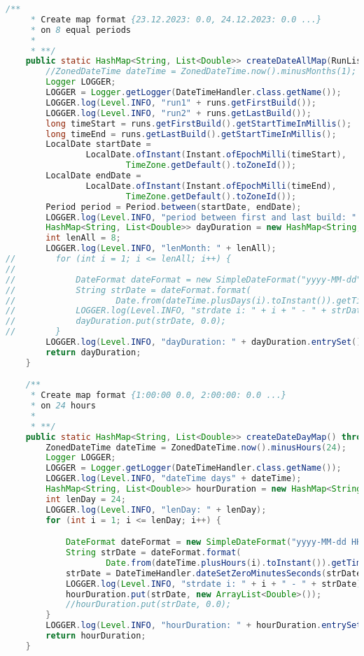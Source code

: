 \begin{lstlisting}[language=Java]
    /**
     * Create map format {23.12.2023: 0.0, 24.12.2023: 0.0 ...}
     * on 8 equal periods
     *
     * **/
    public static HashMap<String, List<Double>> createDateAllMap(RunList<Run> runs) {
        //ZonedDateTime dateTime = ZonedDateTime.now().minusMonths(1);
        Logger LOGGER;
        LOGGER = Logger.getLogger(DateTimeHandler.class.getName());
        LOGGER.log(Level.INFO, "run1" + runs.getFirstBuild());
        LOGGER.log(Level.INFO, "run2" + runs.getLastBuild());
        long timeStart = runs.getFirstBuild().getStartTimeInMillis();
        long timeEnd = runs.getLastBuild().getStartTimeInMillis();
        LocalDate startDate =
                LocalDate.ofInstant(Instant.ofEpochMilli(timeStart),
                        TimeZone.getDefault().toZoneId());
        LocalDate endDate =
                LocalDate.ofInstant(Instant.ofEpochMilli(timeEnd),
                        TimeZone.getDefault().toZoneId());
        Period period = Period.between(startDate, endDate);
        LOGGER.log(Level.INFO, "period between first and last build: " + period);
        HashMap<String, List<Double>> dayDuration = new HashMap<String, List<Double>>();
        int lenAll = 8;
        LOGGER.log(Level.INFO, "lenMonth: " + lenAll);
//        for (int i = 1; i <= lenAll; i++) {
//
//            DateFormat dateFormat = new SimpleDateFormat("yyyy-MM-dd");
//            String strDate = dateFormat.format(
//                    Date.from(dateTime.plusDays(i).toInstant()).getTime());
//            LOGGER.log(Level.INFO, "strdate i: " + i + " - " + strDate);
//            dayDuration.put(strDate, 0.0);
//        }
        LOGGER.log(Level.INFO, "dayDuration: " + dayDuration.entrySet());
        return dayDuration;
    }

    /**
     * Create map format {1:00:00 0.0, 2:00:00: 0.0 ...}
     * on 24 hours
     *
     * **/
    public static HashMap<String, List<Double>> createDateDayMap() throws ParseException {
        ZonedDateTime dateTime = ZonedDateTime.now().minusHours(24);
        Logger LOGGER;
        LOGGER = Logger.getLogger(DateTimeHandler.class.getName());
        LOGGER.log(Level.INFO, "dateTime days" + dateTime);
        HashMap<String, List<Double>> hourDuration = new HashMap<String, List<Double>>();
        int lenDay = 24;
        LOGGER.log(Level.INFO, "lenDay: " + lenDay);
        for (int i = 1; i <= lenDay; i++) {

            DateFormat dateFormat = new SimpleDateFormat("yyyy-MM-dd HH:mm:ss");
            String strDate = dateFormat.format(
                    Date.from(dateTime.plusHours(i).toInstant()).getTime());
            strDate = DateTimeHandler.dateSetZeroMinutesSeconds(strDate);
            LOGGER.log(Level.INFO, "strdate i: " + i + " - " + strDate);
            hourDuration.put(strDate, new ArrayList<Double>());
            //hourDuration.put(strDate, 0.0);
        }
        LOGGER.log(Level.INFO, "hourDuration: " + hourDuration.entrySet());
        return hourDuration;
    }


\end{lstlisting}
